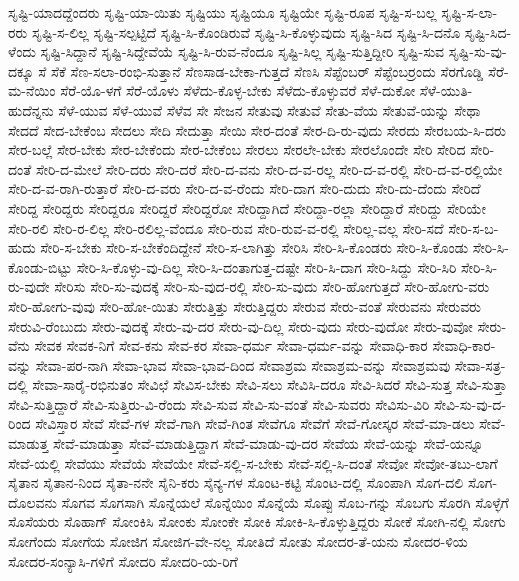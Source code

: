 {ಸೃಷ್ಟಿ-ಯಾದದ್ದೆಂದರು
ಸೃಷ್ಟಿ-ಯಾ-ಯಿತು
ಸೃಷ್ಟಿಯು
ಸೃಷ್ಟಿಯೂ
ಸೃಷ್ಟಿಯೇ
ಸೃಷ್ಟಿ-ರೂಪ
ಸೃಷ್ಟಿ-ಸ-ಬಲ್ಲ
ಸೃಷ್ಟಿ-ಸ-ಲಾ-ರರು
ಸೃಷ್ಟಿ-ಸ-ಲಿಲ್ಲ
ಸೃಷ್ಟಿ-ಸಲ್ಪಟ್ಟಿದೆ
ಸೃಷ್ಟಿ-ಸಿ-ಕೊಂಡಿರುವೆ
ಸೃಷ್ಟಿ-ಸಿ-ಕೊಳ್ಳುವುದು
ಸೃಷ್ಟಿ-ಸಿದ
ಸೃಷ್ಟಿ-ಸಿ-ದನೊ
ಸೃಷ್ಟಿ-ಸಿದ-ಳೆಂದು
ಸೃಷ್ಟಿ-ಸಿದ್ದಾನೆ
ಸೃಷ್ಟಿ-ಸಿದ್ದೇವೆಯೆ
ಸೃಷ್ಟಿ-ಸಿ-ರುವ-ನೆಂದೂ
ಸೃಷ್ಟಿ-ಸಿಲ್ಲ
ಸೃಷ್ಟಿ-ಸುತ್ತಿದ್ದೀರಿ
ಸೃಷ್ಟಿ-ಸುವ
ಸೃಷ್ಟಿ-ಸು-ವು-ದಕ್ಕೂ
ಸೆ
ಸೆಕೆ
ಸೆಣ-ಸಲಾ-ರಂಭಿ-ಸುತ್ತಾನೆ
ಸೆಣಸಾಡ-ಬೇಕಾ-ಗುತ್ತದೆ
ಸೆಣಸಿ
ಸೆಪ್ಟೆಂಬರ್
ಸೆಪ್ಟೆಂಬರ್ರಂದು
ಸೆರಗೊಡ್ಡಿ
ಸೆರೆ-ಮ-ನೆಯಿಂ
ಸೆರೆ-ಯೊ-ಳಗೆ
ಸೆರೆ-ಯೊಳು
ಸೆಳೆದು-ಕೊಳ್ಳ-ಬೇಕು
ಸೆಳೆದು-ಕೊಳ್ಳುವರೆ
ಸೆಳೆ-ದುಕೋ
ಸೆಳೆ-ಯುತಿ-ಹುದೆನ್ನನು
ಸೆಳೆ-ಯುವ
ಸೆಳೆ-ಯುವೆ
ಸೆಳೆವ
ಸೇ
ಸೇಜನ
ಸೇತುವು
ಸೇತುವೆ
ಸೇತು-ವೆಯ
ಸೇತುವೆ-ಯನ್ನು
ಸೇಥಾ
ಸೇದದೆ
ಸೇದ-ಬೇಕೆಂಬ
ಸೇದಲು
ಸೇದಿ
ಸೇದುತ್ತಾ
ಸೇಯಿ
ಸೇರ-ದಂತೆ
ಸೇರ-ದಿ-ರು-ವುದು
ಸೇರದು
ಸೇರಬಯ-ಸಿ-ದರು
ಸೇರ-ಬಲ್ಲೆ
ಸೇರ-ಬೇಕು
ಸೇರ-ಬೇಕೆಂದು
ಸೇರ-ಬೇಕೆಂಬ
ಸೇರಲು
ಸೇರಲೇ-ಬೇಕು
ಸೇರಲೊಂದೇ
ಸೇರಿ
ಸೇರಿದ
ಸೇರಿ-ದಂತೆ
ಸೇರಿ-ದ-ಮೇಲೆ
ಸೇರಿ-ದರು
ಸೇರಿ-ದರೆ
ಸೇರಿ-ದ-ವನು
ಸೇರಿ-ದ-ವ-ರಲ್ಲ
ಸೇರಿ-ದ-ವ-ರಲ್ಲಿ
ಸೇರಿ-ದ-ವ-ರಲ್ಲಿಯೇ
ಸೇರಿ-ದ-ವ-ರಾಗಿ-ರುತ್ತಾರೆ
ಸೇರಿ-ದ-ವರು
ಸೇರಿ-ದ-ವ-ರೆಂದು
ಸೇರಿ-ದಾಗ
ಸೇರಿ-ದುದು
ಸೇರಿ-ದು-ದೆಂದು
ಸೇರಿದೆ
ಸೇರಿದ್ದ
ಸೇರಿದ್ದರು
ಸೇರಿದ್ದರೂ
ಸೇರಿದ್ದರೆ
ಸೇರಿದ್ದರೋ
ಸೇರಿದ್ದಾಗಿದೆ
ಸೇರಿದ್ದಾ-ರಲ್ಲಾ
ಸೇರಿದ್ದಾರೆ
ಸೇರಿದ್ದು
ಸೇರಿಯೇ
ಸೇರಿ-ರಲಿ
ಸೇರಿ-ರ-ಲಿಲ್ಲ
ಸೇರಿ-ರಲಿಲ್ಲ-ವೆಂದೂ
ಸೇರಿ-ರುವ
ಸೇರಿ-ರುವ-ವ-ರಲ್ಲಿ
ಸೇರಿಲ್ಲ-ವಲ್ಲ
ಸೇರಿ-ಸದೆ
ಸೇರಿ-ಸ-ಬ-ಹುದು
ಸೇರಿ-ಸ-ಬೇಕು
ಸೇರಿ-ಸ-ಬೇಕೆಂದಿದ್ದೇನೆ
ಸೇರಿ-ಸ-ಲಾಗಿತ್ತು
ಸೇರಿಸಿ
ಸೇರಿ-ಸಿ-ಕೊಂಡರು
ಸೇರಿ-ಸಿ-ಕೊಂಡು
ಸೇರಿ-ಸಿ-ಕೊಂಡು-ಬಿಟ್ಟು
ಸೇರಿ-ಸಿ-ಕೊಳ್ಳು-ವು-ದಿಲ್ಲ
ಸೇರಿ-ಸಿ-ದಂತಾಗುತ್ತ-ದಷ್ಟೇ
ಸೇರಿ-ಸಿ-ದಾಗ
ಸೇರಿ-ಸಿದ್ದು
ಸೇರಿ-ಸಿರಿ
ಸೇರಿ-ಸಿ-ರು-ವುದೇ
ಸೇರಿಸು
ಸೇರಿ-ಸು-ವುದಕ್ಕೆ
ಸೇರಿ-ಸು-ವುದ-ರಲ್ಲಿ
ಸೇರಿ-ಸು-ವುದು
ಸೇರಿ-ಹೋಗುತ್ತದೆ
ಸೇರಿ-ಹೋಗು-ವರು
ಸೇರಿ-ಹೋಗು-ವುವು
ಸೇರಿ-ಹೋ-ಯಿತು
ಸೇರುತ್ತಿತ್ತು
ಸೇರುತ್ತಿದ್ದರು
ಸೇರುವ
ಸೇರು-ವಂತೆ
ಸೇರುವನು
ಸೇರುವರು
ಸೇರುವಿ-ರೆಂಬುದು
ಸೇರು-ವುದಕ್ಕೆ
ಸೇರು-ವು-ದರ
ಸೇರು-ವು-ದಿಲ್ಲ
ಸೇರು-ವುದು
ಸೇರು-ವುದೋ
ಸೇರು-ವುವೋ
ಸೇರು-ವೆನು
ಸೇವಕ
ಸೇವಕ-ನಿಗೆ
ಸೇವ-ಕನು
ಸೇವ-ಕರ
ಸೇವಾ-ಧರ್ಮ
ಸೇವಾ-ಧರ್ಮ-ವನ್ನು
ಸೇವಾಧಿ-ಕಾರ
ಸೇವಾಧಿ-ಕಾರ-ವನ್ನು
ಸೇವಾ-ಪರ-ನಾಗಿ
ಸೇವಾ-ಭಾವ
ಸೇವಾ-ಭಾವ-ದಿಂದ
ಸೇವಾಶ್ರಮ
ಸೇವಾಶ್ರಮ-ವನ್ನು
ಸೇವಾಶ್ರಮವು
ಸೇವಾ-ಸತ್ರ-ದಲ್ಲಿ
ಸೇವಾ-ಸಾರೈ-ರಭಿನುತಂ
ಸೇವಿಛೆ
ಸೇವಿಸ-ಬೇಕು
ಸೇವಿ-ಸಲು
ಸೇವಿಸಿ-ದರೂ
ಸೇವಿ-ಸಿದರೆ
ಸೇವಿ-ಸುತ್ತ
ಸೇವಿ-ಸುತ್ತಾ
ಸೇವಿ-ಸುತ್ತಿದ್ದಾರೆ
ಸೇವಿ-ಸುತ್ತಿರು-ವಿ-ರೆಂದು
ಸೇವಿ-ಸುವ
ಸೇವಿ-ಸು-ವಂತೆ
ಸೇವಿ-ಸುವರು
ಸೇವಿಸು-ವಿರಿ
ಸೇವಿ-ಸು-ವು-ದ-ರಿಂದ
ಸೇವಿಸ್ತಾರ
ಸೇವೆ
ಸೇವೆ-ಗಳ
ಸೇವೆ-ಗಾಗಿ
ಸೇವೆ-ಗಿಂತ
ಸೇವೆಗೂ
ಸೇವೆಗೆ
ಸೇವೆ-ಗೋಸ್ಕರ
ಸೇವೆ-ಮಾ-ಡಲು
ಸೇವೆ-ಮಾಡುತ್ತ
ಸೇವೆ-ಮಾಡುತ್ತಾ
ಸೇವೆ-ಮಾಡುತ್ತಿದ್ದಾಗ
ಸೇವೆ-ಮಾಡು-ವು-ದರ
ಸೇವೆಯ
ಸೇವೆ-ಯನ್ನು
ಸೇವೆ-ಯನ್ನೂ
ಸೇವೆ-ಯಲ್ಲಿ
ಸೇವೆಯು
ಸೇವೆಯೆ
ಸೇವೆಯೇ
ಸೇವೆ-ಸಲ್ಲಿ-ಸ-ಬೇಕು
ಸೇವೆ-ಸಲ್ಲಿ-ಸಿ-ದಂತೆ
ಸೇವೋ
ಸೇವೋ-ತಬು-ಲಾಗೆ
ಸೈತಾನ
ಸೈತಾನ-ನಿಂದ
ಸೈತಾ-ನನೇ
ಸೈನಿ-ಕರು
ಸೈನ್ಯ-ಗಳ
ಸೊಂಟ-ಕಟ್ಟಿ
ಸೊಂಟ-ದಲ್ಲಿ
ಸೊಂಪಾಗಿ
ಸೊಗ-ದಲಿ
ಸೊಗ-ದೊಲವನು
ಸೊಗವ
ಸೊಗಸಾಗಿ
ಸೊನ್ನೆಯಲೆ
ಸೊನ್ನೆಯಿಂ
ಸೊನ್ನೆಯೆ
ಸೊಪ್ಪು
ಸೊಬ-ಗನ್ನು
ಸೊಬಗು
ಸೊರಗಿ
ಸೊಳ್ಳೆಗೆ
ಸೊಸೆಯರು
ಸೊಹಾಗ್
ಸೋಂಕಿಸಿ
ಸೋಂಕು
ಸೋಂಕೇ
ಸೋಕಿ
ಸೋಕಿ-ಸಿ-ಕೊಳ್ಳುತ್ತಿದ್ದರು
ಸೋಕೆ
ಸೋಗಿ-ನಲ್ಲಿ
ಸೋಗು
ಸೋಗೆಂದು
ಸೋಗೆಯ
ಸೋಜಿಗ
ಸೋಜಿಗ-ವೇ-ನಲ್ಲ
ಸೋತಿದೆ
ಸೋತು
ಸೋದರ-ತೆ-ಯನು
ಸೋದರ-ಳಿಯ
ಸೋದರ-ಸಂನ್ಯಾಸಿ-ಗಳಿಗೆ
ಸೋದರಿ
ಸೋದರಿ-ಯ-ರಿಗೆ
}
